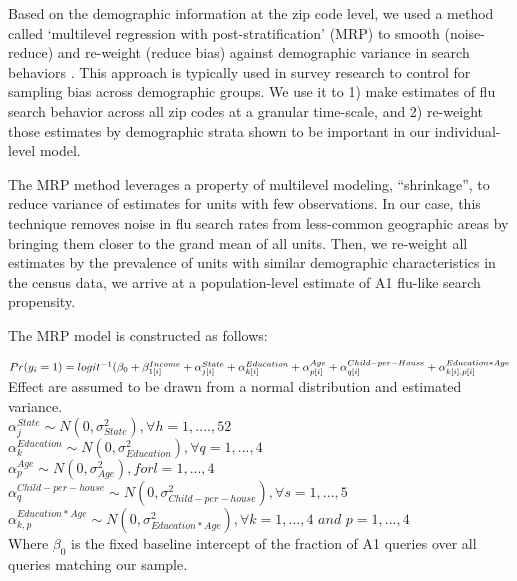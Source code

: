 \documentclass[12pt]{article}
\begin{document}
Based on the demographic information at the zip code level, we used a method called `multilevel regression with post-stratification' (MRP) to smooth (noise-reduce) and re-weight (reduce bias) against demographic variance in search behaviors \citep{gelman_and_little_1997, park_gelman_bafumi_2004}. This approach is typically used in survey research to control for sampling bias across demographic groups. We use it to 1) make estimates of flu search behavior across all zip codes at a granular time-scale, and 2) re-weight those estimates by demographic strata shown to be important in our individual-level model. 

The MRP method leverages a property of multilevel modeling, ``shrinkage'', to reduce variance of estimates for units with few observations. In our case, this technique removes noise in flu search rates from less-common geographic areas by bringing them closer to the grand mean of all units. Then, we re-weight all estimates by the prevalence of units with similar demographic characteristics in the census data, we arrive at a population-level estimate of A1 flu-like search propensity. 

The MRP model is constructed as follows:

$Pr(y_i = 1) = logit^{-1}( \beta_0  + \beta_{1[i]}^{Income}
+ \alpha_{j[i]}^{State}  
+ \alpha_{k[i]}^{Education}  \\
+ \alpha_{p[i]}^{Age} 
+ \alpha_{q[i]}^{Child-per-House}
+ \alpha_{k[i],p[i]}^{Education*Age} $
\\

Effect are assumed to be drawn from a normal distribution and estimated variance. \\

\noindent
$\alpha_j^{State} \sim  N (0, \sigma_{State}^2), \forall h = 1, ...., 52  $ \\
$\alpha_k^{Education} \sim  N (0, \sigma_{Education}^2), \forall q = 1, ..., 4  $ \\
$\alpha_p^{Age} \sim  N (0, \sigma_{Age}^2), for l = 1, ..., 4 $ \\
$\alpha_q^{Child-per-house} \sim  N (0, \sigma_{Child-per-house}^2), \forall s = 1, ..., 5  $ \\
$\alpha_{k,p}^{Education*Age} \sim  N (0, \sigma_{Education*Age}^2), \forall k = 1, ..., 4 \textit{ and } p = 1,...,4  $ \\

Where $\beta_0$ is the fixed baseline intercept of the fraction of A1 queries over all queries matching our sample. 
\end{document}

